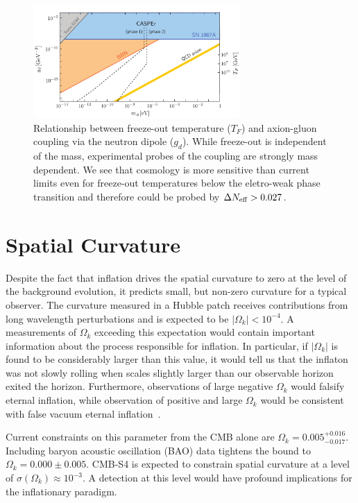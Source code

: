 \begin{figure}[h!]
\centering \includegraphics[width=0.70\textwidth]{Neutrinos/DipoleWithCASPErAndBBN.pdf}
\caption{Relationship between freeze-out temperature ($T_F$) and axion-gluon coupling via the neutron dipole ($g_d$).  While freeze-out is independent of the mass, experimental probes of the coupling are strongly mass dependent. We see that cosmology is more sensitive than current limits even for freeze-out temperatures below the eletro-weak phase transition and therefore could be probed by $\Delta N_{\rm eff} > 0.027$.   }
\label{fig:axiondipole}
\end{figure}

\section{Spatial Curvature}

Despite the fact that inflation drives the spatial curvature to zero at the level of the background evolution, it predicts small, but non-zero curvature for a typical observer. The curvature measured in a Hubble patch receives contributions from long wavelength perturbations and is expected to be $|\Omega_k|<10^{-4}$. A measurements of $\Omega_k$ exceeding this expectation would contain important information about the process responsible for inflation. In particular, if $|\Omega_k|$ is found to be considerably larger than this value, it would tell us that the inflaton was not slowly rolling when scales slightly larger than our observable horizon exited the horizon. Furthermore, observations of large negative $\Omega_k$ would falsify eternal inflation, while observation of positive and large $\Omega_k$ would be consistent with false vacuum eternal inflation~\cite{Guth:2012ww,Kleban:2012ph}.

Current constraints on this parameter from the CMB alone are $\Omega_k= 0.005^{+0.016}_{-0.017}$. Including baryon acoustic oscillation (BAO) data tightens the bound to $\Omega_k=0.000\pm0.005$. CMB-S4 is expected to constrain spatial curvature at a level of $\sigma(\Omega_k)\approx 10^{-3}$. A detection at this level would have profound implications for the inflationary paradigm. 



